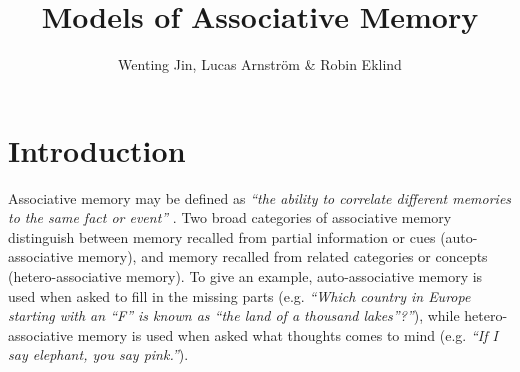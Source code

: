 \documentclass[12pt, a4paper]{article}
\title{Models of Associative Memory}
\author{Wenting Jin, Lucas Arnström \& Robin Eklind}
\begin{document}
\maketitle

\tableofcontents

\clearpage



\section{Introduction}

Associative memory may be defined as \textit{``the ability to correlate different memories to the same fact or event''} \cite{memristor_conditioning}. Two broad categories of associative memory distinguish between memory recalled from partial information or cues (auto-associative memory), and memory recalled from related categories or concepts (hetero-associative memory). To give an example, auto-associative memory is used when asked to fill in the missing parts (e.g. \textit{``Which country in Europe starting with an ``F'' is known as ``the land of a thousand lakes''?''}), while hetero-associative memory is used when asked what thoughts comes to mind (e.g. \textit{``If I say elephant, you say pink.''}).


%
%
%
\end{document}

